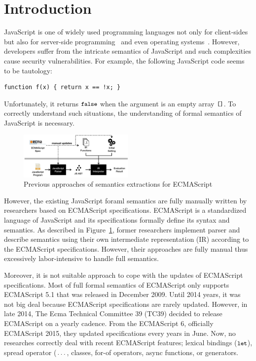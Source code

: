 \section{Introduction}

JavaScript is one of widely used programming languages not only for client-sides
but also for server-side programming~\cite{???} and even operating systems~\cite{???}.
However, developers suffer from the intricate semantics of JavaScript and
such complexities cause security vulnerabilities. For example, the following JavaScript
code seems to be tautology:
\begin{lstlisting}[style=myJSstyle]
function f(x) { return x == !x; }
\end{lstlisting}
Unfortunately, it returns \( \texttt{\small false} \) when the argument is an empty array
\( \texttt{\small[]} \). To correctly understand such situations, the understanding of
formal semantics of JavaScript is necessary.

\begin{figure}
  \centering
  \includegraphics[width=0.5\textwidth]{img/previous.png}
  \caption{Previous approaches of semantics extractions for ECMAScript}
  \label{fig:previous}
\end{figure}

However, the existing JavaScript foraml semantics are fully manually written
by researchers based on ECMAScript specifications. ECMAScript is a standardized language
of JavaScript and its specifications formally define its syntax and semantics.
As described in Figure~\ref{fig:previous}, former researchers implement parser and
describe semantics using their own intermediate representation (IR) according to the ECMAScript
specifications. However, their approaches are fully manual thus excessively labor-intensive
to handle full semantics.

Moreover, it is not suitable approach to cope with the updates of ECMAScript specifications.
Most of full formal semantics of ECMAScript only supports ECMAScript 5.1 that was
released in December 2009. Until 2014 years, it was not big deal because ECMAScript
specifications are rarely updated. However, in late 2014, The Ecma Technical
Committee 39 (TC39) decided to release ECMAScript on a yearly cadence. From the
ECMAScript 6, officially ECMAScript 2015, they updated specifications every years
in June. Now, no researches correctly deal with recent ECMAScript features;
lexical bindings (\( \texttt{\small let} \)), spread operator (\( \texttt{\small...} \),
classes, for-of operators, async functions, or generators.

